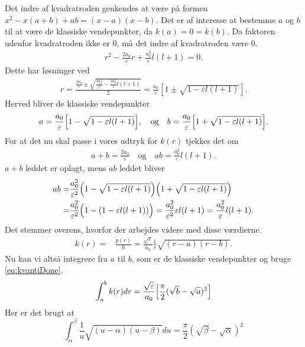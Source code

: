 Det indre af kvadratroden genkendes at være på formen $x^2 -x(a+b) + ab = (x-a)(x-b)$. Det er af interesse at bestemme $a$ og $b$ til at være de klassiske vendepunkter, da $k(a) = 0 = k(b)$. Da faktoren udenfor kvadratroden ikke er $0$, må det indre af kvadratroden være $0$.
%
\begin{align}
    r^2 - \frac{2a_0}{\varepsilon}r + \frac{a_0^2}{\varepsilon}l(l+1) = 0.
\end{align}
Dette har løsninger ved
\begin{align}
  r = \frac{\frac{2a_0}{\varepsilon} \pm \sqrt{\frac{4a_0^2}{\varepsilon^2} - \frac{4a_0^2}{\varepsilon}l(l+1)   }  }{2}
  = \frac{a_0}{\varepsilon}\left[1 \pm \sqrt{1-\varepsilon l(l+1)}\right].
\end{align}
Herved bliver de klassiske vendepunkter
\begin{align}
    a =  \frac{a_0}{\varepsilon}\Bigl[1-\sqrt{1-\varepsilon l(l+1)}  \Bigr],\quad \text{og} \quad b = \frac{a_0}{\varepsilon}\Bigl[1+\sqrt{1-\varepsilon l(l+1)}  \Bigr].
\end{align}
For at det nu skal passe i vores udtryk for $k(r)$ tjekkes det om
\begin{align}
    a+b = \frac{2a_0}{\varepsilon} \quad \text{og} \quad  ab  = \frac{a_0^2}{\varepsilon} l(l+1).
\end{align}
$a+b$ leddet er oplagt, mens $ab$ leddet bliver
\begin{align}
  ab = & \frac{a_0^2}{\varepsilon^2}\Bigl(1-\sqrt{1-\varepsilon l(l+1)} \Bigr)\Bigl(1+\sqrt{1-\varepsilon l(l+1)} \Bigr)\\
     = & \frac{a_0^2}{\varepsilon^2}\Bigl(1-(1-\varepsilon l(l+1)) \Bigr) =  \frac{a_0^2}{\varepsilon^2} \varepsilon l(l+1)
     = \frac{a_0^2}{\varepsilon} l(l+1).
\end{align}
%
Det stemmer overens, hvorfor der arbejdes videre med disse værdierne.
\begin{align}
    k(r) = & \frac{p(r)}{\hbar} = \frac{\sqrt{\varepsilon}}{a_0}\frac{1}{r}\sqrt{(r-a)(r-b)}.
\end{align}
Nu kan vi altså integrere fra $a$ til $b$, som er de klassiske vendepunkter og bruge \cref{eq:kvantiDone}.
\begin{equation}
  \int_{a}^{b}k(r)dr = \frac{\sqrt{\varepsilon}}{a_0} \Bigl[\frac{\pi}{2}(\sqrt{b}-\sqrt{a})^2  \Bigr]
\end{equation}
Her er det brugt at
\begin{equation}
  \int_{\alpha}^{\beta}\frac{1}{u}\sqrt{(u-\alpha)(u-\beta)}du = \frac{\pi}{2}(\sqrt{\beta}-\sqrt{\alpha})^2
\end{equation}
